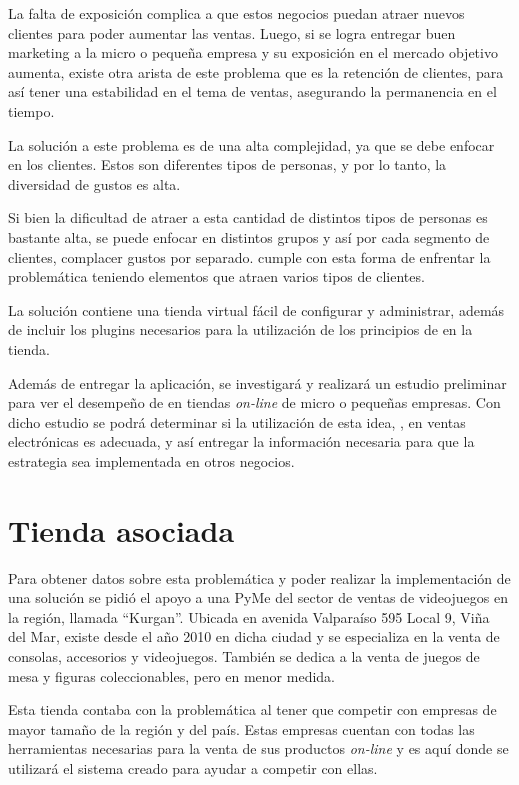 La falta de exposición complica a que estos negocios puedan atraer nuevos clientes
para poder aumentar las ventas.
Luego, si se logra entregar buen marketing a la micro o pequeña empresa y su
exposición en el mercado objetivo aumenta, existe otra arista de este problema
que es la retención de clientes, para así tener una estabilidad en el tema
de ventas, asegurando la permanencia en el tiempo.

La solución a este problema es de una alta complejidad, ya que se debe enfocar en
los clientes.
Estos son diferentes tipos de personas, y por lo tanto, la diversidad de gustos es
alta.

Si bien la dificultad de atraer a esta cantidad de distintos tipos de personas
es bastante alta, se puede enfocar en distintos grupos y así por cada segmento
de clientes, complacer gustos por separado.
{\GAM} cumple con esta forma de enfrentar la problemática teniendo elementos que
atraen varios tipos de clientes.

La solución contiene una tienda virtual fácil de configurar y administrar,
además de incluir los plugins necesarios para la utilización de los principios
de {\gam} en la tienda.

Además de entregar la aplicación, se investigará y realizará un estudio preliminar
para ver el desempeño de {\gam} en tiendas \emph{on-line} de micro o pequeñas empresas.
Con dicho estudio se podrá determinar si la utilización de esta idea, {\gam}, en ventas
electrónicas es adecuada,
y así entregar la información necesaria para que la estrategia sea implementada
en otros negocios.

\section{Tienda asociada}

Para obtener datos sobre esta problemática y poder realizar la implementación de una
solución se pidió el apoyo a una PyMe del sector de ventas de videojuegos en la región,
llamada ``Kurgan''. Ubicada en avenida Valparaíso 595 Local 9, Viña del Mar, existe desde
el año 2010 en dicha ciudad y se especializa en la venta de consolas, accesorios y videojuegos.
También se dedica a la venta de juegos de mesa y figuras coleccionables, pero en menor medida.

Esta tienda contaba con la problemática al tener que competir con empresas de mayor 
tamaño de la región y del país. Estas empresas cuentan con todas las herramientas
necesarias para la venta de sus productos \emph{on-line} y es aquí donde se utilizará 
el sistema creado para ayudar a competir con ellas. 

